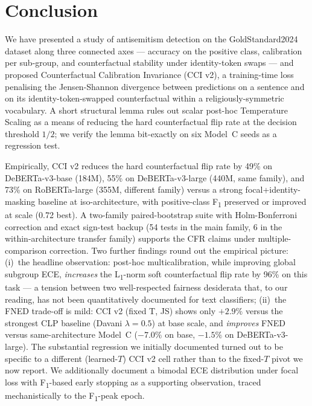\section{Conclusion}
\label{sec:conclusion}

We have presented a study of antisemitism detection on the GoldStandard2024 dataset along three connected axes --- accuracy on the positive class, calibration per sub-group, and counterfactual stability under identity-token swaps --- and proposed Counterfactual Calibration Invariance (CCI v2), a training-time loss penalising the Jensen-Shannon divergence between predictions on a sentence and on its identity-token-swapped counterfactual within a religiously-symmetric vocabulary. A short structural lemma rules out scalar post-hoc Temperature Scaling as a means of reducing the hard counterfactual flip rate at the decision threshold $1/2$; we verify the lemma bit-exactly on six Model~C seeds as a regression test.

Empirically, CCI v2 reduces the hard counterfactual flip rate by 49\% on DeBERTa-v3-base (184M), 55\% on DeBERTa-v3-large (440M, same family), and 73\% on RoBERTa-large (355M, different family) versus a strong focal+identity-masking baseline at iso-architecture, with positive-class F\textsubscript{1} preserved or improved at scale (0.72 best). A two-family paired-bootstrap suite with Holm-Bonferroni correction and exact sign-test backup (54 tests in the main family, 6 in the within-architecture transfer family) supports the CFR claims under multiple-comparison correction. Two further findings round out the empirical picture: (i)~the headline observation: post-hoc multicalibration, while improving global subgroup ECE, \emph{increases} the L\textsubscript{1}-norm soft counterfactual flip rate by 96\% on this task --- a tension between two well-respected fairness desiderata that, to our reading, has not been quantitatively documented for text classifiers; (ii)~the FNED trade-off is mild: CCI v2 (fixed T, JS) shows only $+2.9\%$ versus the strongest CLP baseline (Davani $\lambda{=}0.5$) at base scale, and \emph{improves} FNED versus same-architecture Model~C ($-7.0\%$ on base, $-1.5\%$ on DeBERTa-v3-large). The substantial regression we initially documented turned out to be specific to a different (learned-$T$) CCI v2 cell rather than to the fixed-$T$ pivot we now report. We additionally document a bimodal ECE distribution under focal loss with F\textsubscript{1}-based early stopping as a supporting observation, traced mechanistically to the F\textsubscript{1}-peak epoch.

